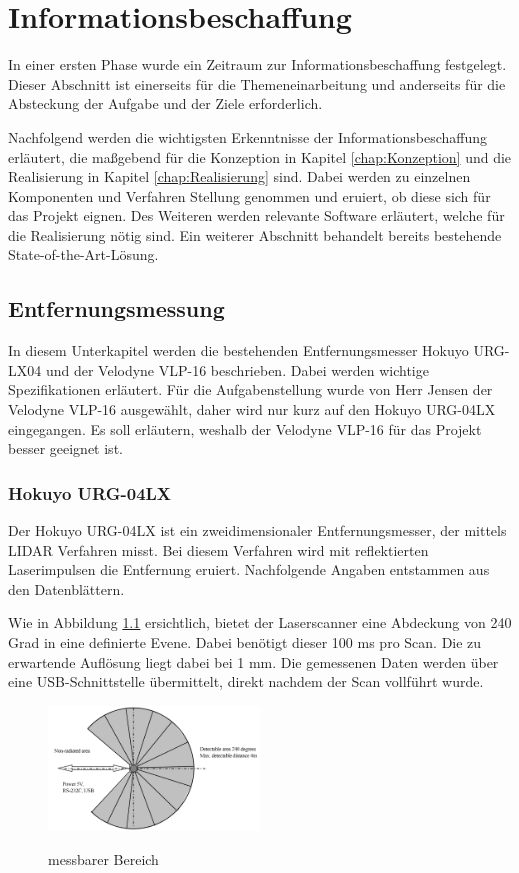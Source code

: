 \chapter{Informationsbeschaffung}
\label{Informationsbeschaffung}
 In einer ersten Phase wurde ein Zeitraum zur Informationsbeschaffung festgelegt. Dieser Abschnitt ist einerseits für die Themeneinarbeitung und anderseits für die Absteckung der Aufgabe und der Ziele erforderlich.

Nachfolgend werden die wichtigsten Erkenntnisse der Informationsbeschaffung erläutert, die maßgebend für die Konzeption in Kapitel \ref{chap:Konzeption} und die Realisierung in Kapitel \ref{chap:Realisierung} sind. Dabei werden zu einzelnen Komponenten und Verfahren Stellung genommen und eruiert, ob diese sich für das Projekt eignen. Des Weiteren werden relevante Software erläutert, welche für die Realisierung nötig sind. Ein weiterer Abschnitt behandelt bereits bestehende State-of-the-Art-Lösung.


\section{Entfernungsmessung}
\label{sec:Entfernungsmessung}
In diesem Unterkapitel werden die bestehenden Entfernungsmesser Hokuyo URG-LX04 und der Velodyne VLP-16 beschrieben. Dabei werden wichtige Spezifikationen erläutert. Für die Aufgabenstellung wurde von Herr Jensen der Velodyne VLP-16 ausgewählt, daher wird nur kurz auf den Hokuyo URG-04LX eingegangen. Es soll erläutern, weshalb der Velodyne VLP-16 für das Projekt besser geeignet ist.

\subsection{Hokuyo URG-04LX}
\label{subsec:Hokuyo}
Der Hokuyo URG-04LX ist ein zweidimensionaler Entfernungsmesser, der mittels \ac{LIDAR} Verfahren misst. Bei diesem Verfahren wird mit reflektierten Laserimpulsen die Entfernung eruiert. Nachfolgende Angaben entstammen aus den Datenblättern. \cite{hokuyo} 

Wie in Abbildung \ref{fig:URG-04LX} ersichtlich, bietet der Laserscanner eine Abdeckung von 240 Grad in eine definierte Evene. Dabei benötigt dieser 100 ms pro Scan. Die zu erwartende Auflösung liegt dabei bei 1 mm. Die gemessenen Daten werden über eine USB-Schnittstelle übermittelt, direkt nachdem der Scan vollführt wurde.

\begin{figure}[H]
	\centering
	\includegraphics[width=0.5\textwidth]
	{resources/detectableAngle.PNG}
	\caption[messbarer Bereich]{messbarer Bereich} \protect\cite{hokuyo}
	\label{fig:URG-04LX}
\end{figure}

